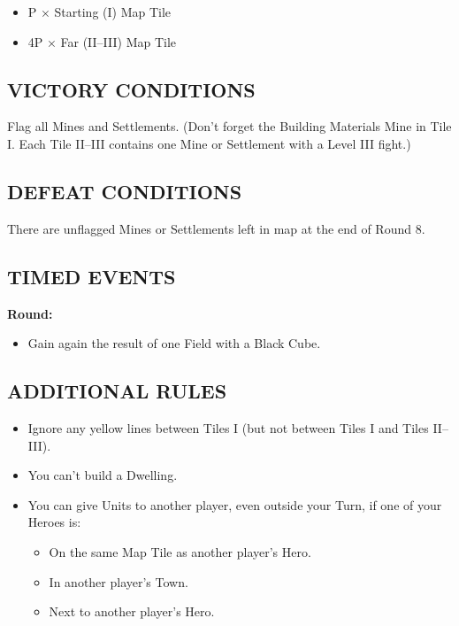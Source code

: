\begin{multicols*}{2}
\begin{itemize}
  \item P × Starting (I) Map Tile
  \item 4P × Far (II--III) Map Tile
\end{itemize}

\subsection*{\MakeUppercase{Victory Conditions}}

Flag all Mines and Settlements. (Don't forget the Building Materials Mine in Tile I. Each Tile II--III contains one Mine or Settlement with a Level III fight.)

\subsection*{\MakeUppercase{Defeat Conditions}}

There are unflagged Mines or Settlements left in map at the end of Round 8.

\subsection*{\MakeUppercase{Timed Events}}

\textbf{ Round:}
\begin{itemize}
  \item Gain again the result of one Field with a Black Cube.
\end{itemize}

\subsection*{\MakeUppercase{Additional Rules}}

\begin{itemize}
  \item Ignore any yellow lines between Tiles I (but not between Tiles I and Tiles II--III).

  \item You can't build a  Dwelling.

  \item You can give Units to another player, even outside your Turn, if one of your Heroes is:
  \begin{itemize}
    \item On the same Map Tile as another player's Hero.
    \item In another player's Town.
    \item Next to another player's Hero.
  \end{itemize}


\end{itemize}
\end{multicols*}
